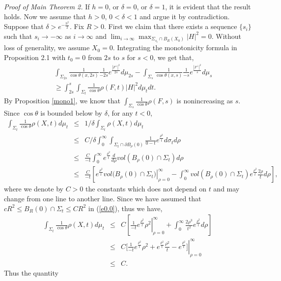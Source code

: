{\it Proof of Main Theorem 2.} If $h=0$, or $\delta=0$, or
$\delta=1$, it is evident that the result holds. Now we assume
that $h>0$, $0<\delta<1$ and argue it by contradiction. Suppose
that $\delta> e^{-\frac{h^2}{2}}$. Fix $R>0$. First we claim that
there exists a sequence $\{s_i\}$ such that $s_i\to -\infty$ as
$i\to \infty$ and $\lim_{i\to \infty}\max_{\Sigma_{s_i}\cap
B_R(X_0)}|H|^2=0$. Without loss of generality, we assume $X_0=0$.
Integrating the monotonicity formula in Proposition 2.1 with
$t_0=0$ from $2s$ to $s$ for $s<0$, we get that,
\begin{eqnarray*}
&&\int_{\Sigma_{2s}}\frac{1}{\cos\theta(x,
2s)}\frac{1}{-2s}e^{\frac{|F^\perp|^2}{2s}}d\mu_{2s}-\int_{\Sigma_s}\frac{1}{\cos\theta(x,
s)}\frac{1}{-s}e^{\frac{|F^\perp|^2}{s}}d\mu_s\\ &&\geq
\int_{2s}^s\int_{\Sigma_t}\frac{1}{\cos\theta}\rho(F,
t)|H|^2d\mu_t dt.
\end{eqnarray*}  By Proposition \ref{mono1},
we know that $\int_{\Sigma_s}\frac{1}{\cos\theta}\rho(F, s)$ is
nonincreasing as $s$. Since $\cos\theta$ is bounded below by
$\delta$, for any $t<0$,
\begin{eqnarray*}
\int_{\Sigma_t}\frac{1}{\cos\theta}\rho(X, t) d\mu_t  &\leq&
1/\delta\int_{\Sigma_t} \rho(X, t) d\mu_t \\ &\leq& C/\delta
\int_0^\infty\int_{\Sigma_t\cap \partial
B_\rho(0)}\frac{1}{0-t}e^{\frac{\rho^2}{t}}d\sigma_t d\rho \\
&\leq& \frac{C}{-t}\int_0^\infty
e^{\frac{\rho^2}{t}}\frac{d}{d\rho}vol(B_\rho(0)\cap
\Sigma_t)d\rho \\
&\leq&\frac{C}{-t}[e^{\frac{\rho^2}{t}}vol(\left. B_\rho(0)\cap
\Sigma_t)\right|_{\rho=0}^\infty-\int_0^\infty
vol(B_\rho(0)\cap\Sigma_t)e^{\frac{\rho^2}{t}}\frac{2\rho}{t}d\rho],
\end{eqnarray*} where we denote by $C>0$ the constants which does
not depend on $t$ and may change from one line to another line.
Since we have assumed that $cR^2\leq B_R(0)\cap \Sigma_t\leq CR^2$
in (\ref{e0.0}),  thus we have,
\begin{eqnarray*}
\int_{\Sigma_t}\frac{1}{\cos\theta}\rho(X, t) d\mu_t &\leq& C
[\left.\frac{1}{-t}e^{\frac{\rho^2}{t}}\rho^2\right|_{\rho=0}^\infty+\int_0^\infty
\frac{2\rho^3}{t^2}e^{\frac{\rho^2}{t}}d\rho]\\ &\leq& C
[\left.\frac{1}{-t}e^{\frac{\rho^2}{t}}\rho^2+e^{\frac{\rho^2}{t}}\frac{\rho^2}{t}
-e^{\frac{\rho^2}{t}}]\right|_{\rho=0}^\infty \\ &\leq & C.
\end{eqnarray*}  Thus the quantity
